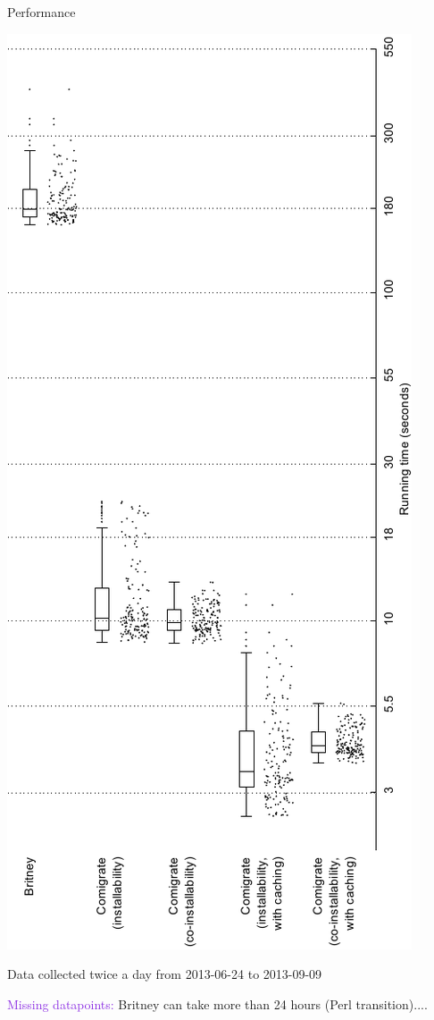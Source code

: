 \documentclass[xcolor={dvipsnames}]{beamer}
\newcommand{\EEE}[1]{\textcolor{BlueViolet}{#1}}
\begin{document}
\begin{frame}{Performance}

\includegraphics[height=\linewidth,angle=-90]{performance.pdf}

\vspace{0.8em}

Data collected twice a day from 2013-06-24 to 2013-09-09

\vspace{0.5em}

\EEE{Missing datapoints:} Britney can take more than 24 hours (Perl
transition)....
\end{frame}
\end{document}
